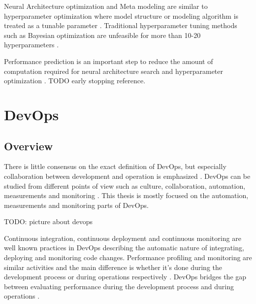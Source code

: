 Neural Architecture optimization and Meta modeling are similar to hyperparameter optimization where model structure or modeling algorithm is treated as a tunable parameter \parencite{bakerAcceleratingNeuralArchitecture2017}. Traditional hyperparameter tuning methods such as Bayesian optimization are unfeasible for more than 10-20 hyperparameters \parencite{maclaurinGradientbasedHyperparameterOptimization2015}.

Performance prediction is an important step to reduce the amount of computation required for neural architecture search and hyperparameter optimization \parencite{bakerAcceleratingNeuralArchitecture2017}. TODO early stopping reference. 



\section{DevOps}
\label{sec:devops}

\subsection{Overview}

There is little consensus on the exact definition of DevOps, but especially collaboration between development and operation is emphasized \parencite{mishraDevOpsSoftwareQuality2020,wallerIncludingPerformanceBenchmarks2015}. DevOps can be studied from different points of view such as culture, collaboration, automation, measurements and monitoring \parencite{mishraDevOpsSoftwareQuality2020, wallerIncludingPerformanceBenchmarks2015}. This thesis is mostly focused on the automation, measurements and monitoring parts of DevOps.


TODO: picture about devops

Continuous integration, continuous deployment and continuous monitoring are well known practices in DevOps \parencite{wallerIncludingPerformanceBenchmarks2015} describing the automatic nature of integrating, deploying and monitoring code changes. Performance profiling and monitoring are similar activities and the main difference is whether it's done during the development process or during operations respectively \parencite{wallerIncludingPerformanceBenchmarks2015}. DevOps bridges the gap between evaluating performance during the development process and during operations \parencite{brunnertPerformanceorientedDevOpsResearch2015}.


